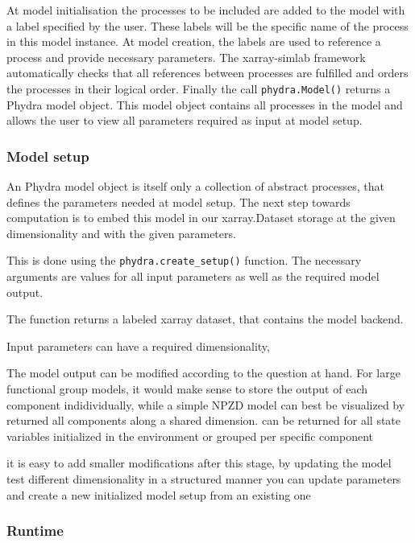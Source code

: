 \documentclass[template.tex]{subfiles}
\begin{document}
At model initialisation the processes to be included are added to the model with a label specified by the user. These labels will be the specific name of the process in this model instance. At model creation, the labels are used to reference a process and provide necessary parameters.
The xarray-simlab framework automatically checks that all references between processes are fulfilled and orders the processes in their logical order. 
Finally the call \texttt{phydra.Model()} returns a Phydra model object. This model object contains all processes in the model and allows the user to view all parameters required as input at model setup. 

\subsubsection{Model setup}

An Phydra model object is itself only a collection of abstract processes, that defines the parameters needed at model setup. The next step towards computation is to embed this model in our xarray.Dataset storage at the given dimensionality and with the given parameters.

This is done using the \texttt{phydra.create\_setup()} function. The necessary arguments are values for all input parameters as well as the required model output. 

The function returns a labeled xarray dataset, that contains the model backend.


Input parameters can have a required dimensionality, 

The model output can be modified according to the question at hand. For large functional group models, it would make sense to store the output of each component indidividually, while a simple NPZD model can best be visualized by returned all components along a shared dimension.
can be returned for all state variables initialized in the environment
or grouped per specific component


it is easy to add smaller modifications after this stage, by updating the model 
test different dimensionality in a structured manner
you can update parameters and create a new initialized model setup from an existing one

\subsubsection{Runtime}
\end{document}
